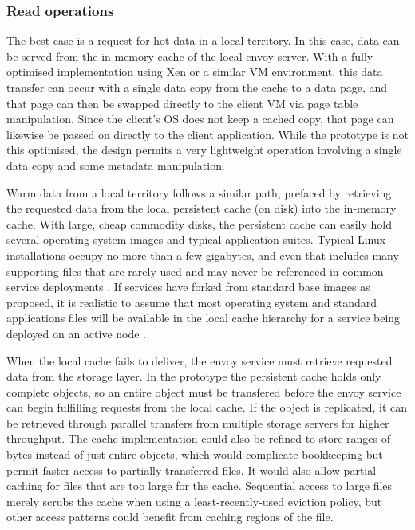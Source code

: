 \subsubsection{Read operations}\label{sec:data-paths-read}

The best case is a request for hot data in a local territory. In this case, data can be served from the in-memory cache of the local envoy server. With a fully optimised implementation using Xen or a similar VM environment, this data transfer can occur with a single data copy from the cache to a data page, and that page can then be swapped directly to the client VM via page table manipulation. Since the client's OS does not keep a cached copy, that page can likewise be passed on directly to the client application. While the prototype is not this optimised, the design permits a very lightweight operation involving a single data copy and some metadata manipulation.

Warm data from a local territory follows a similar path, prefaced by retrieving the requested data from the local persistent cache (on disk) into the in-memory cache. With large, cheap commodity disks, the persistent cache can easily hold several operating system images and typical application suites. Typical Linux installations occupy no more than a few gigabytes, and even that includes many supporting files that are rarely used and may never be referenced in common service deployments \cite{gibson98b}. If services have forked from standard base images as proposed, it is realistic to assume that most operating system and standard applications files will be available in the local cache hierarchy for a service being deployed on an active node \cite{klosterman}.

When the local cache fails to deliver, the envoy service must retrieve requested data from the storage layer. In the prototype the persistent cache holds only complete objects, so an entire object must be transfered before the envoy service can begin fulfilling requests from the local cache. If the object is replicated, it can be retrieved through parallel transfers from multiple storage servers for higher throughput. The cache implementation could also be refined to store ranges of bytes instead of just entire objects, which would complicate bookkeeping but permit faster access to partially-transferred files. It would also allow partial caching for files that are too large for the cache. Sequential access to large files merely scrubs the cache when using a least-recently-used eviction policy, but other access patterns could benefit from caching regions of the file.

